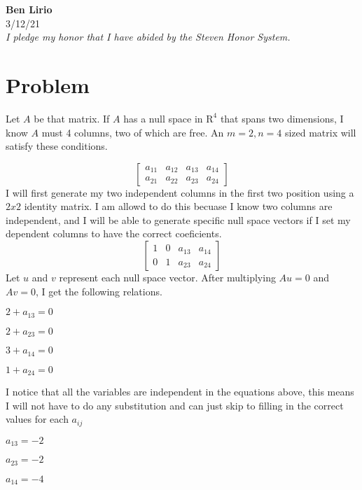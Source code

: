 \documentclass{article}
\begin{document}
\begin{titlepage}
		\begin{center}
		\Large\textbf{Ben Lirio}\\
		\large{3/12/21} \\
		\large\textit{I pledge my honor that I have abided by the Steven Honor System.}
		\end{center}
\end{titlepage}
\section{Problem}
Let $A$ be that matrix. If $A$ has a null space in $\textrm{R}^4$ that spans two dimensions, I know $A$ must 4 columns, two of which are free. An $m = 2, n = 4$ sized matrix will satisfy these conditions.

\[
\begin{bmatrix}
a_{11} & a_{12} & a_{13} & a_{14} \\
a_{21} & a_{22} & a_{23} & a_{24}
\end{bmatrix}
\]
I will first generate my two independent columns in the first two position using a $2x2$ identity matrix. I am allowd to do this becuase I know two columns are independent, and I will be able to generate specific null space vectors if I set my dependent columns to have the correct coeficients.
\[
\begin{bmatrix}
1 & 0 & a_{13} & a_{14} \\
0 & 1 & a_{23} & a_{24}
\end{bmatrix}
\]
Let $u$ and $v$ represent each null space vector. After multiplying $Au = 0$ and $Av = 0$, I get the following relations.

$2 + a_{13} = 0$

$2 + a_{23} = 0$

$3 + a_{14} = 0$

$1 + a_{24} = 0$

I notice that all the variables are independent in the equations above, this means I will not have to do any substitution and can just skip to filling in the correct values for each $a_{ij}$

$a_{13} = -2$

$a_{23} = -2$

$a_{14} = -4$
\end{document}
